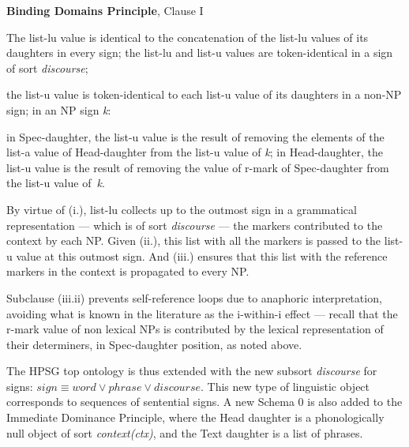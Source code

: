 \documentclass[output=paper
,modfonts
,nonflat]{langsci/langscibook}
\begin{document}
\begin{exe}
\ex\label{bdp}
\textbf{Binding Domains Principle}, Clause I
\begin{xlisti}
\ex The {\sc list-lu} value is identical to the 
concatenation of the {\sc list-lu} values of its daughters in every sign;
\ex  the {\sc list-lu} and {\sc list-u} values are 
token-identical in a sign of sort {\it discourse};
\ex
\begin{xlisti}
\ex  the {\sc list-u} value is token-identical to each 
{\sc list-u} value of its daughters in a non-NP sign;
\ex in an NP sign {\it k}:

\begin{itemize}
\ex in Spec-daughter, the {\sc list-u} value is the result of removing the 
elements of the {\sc list-a} value of Head-daughter from the {\sc list-u} value of {\it k};
\ex in Head-daughter, the {\sc list-u} value is the result of removing 
the value of {\sc r-mark} of Spec-daughter from the {\sc list-u} value of~{\it k}.
\end{itemize}

\end{xlisti}
\end{xlisti}
\end{exe}


\noindent By virtue of (i.), {\sc list-lu} collects up to the outmost sign in a grammatical 
representation --- which is of sort {\it discourse} --- the markers contributed to the context
by each NP. Given (ii.), this list with all the markers is passed to the
{\sc list-u} value at this outmost sign. And (iii.) ensures that this
list with the reference markers in the context is propagated to every NP. 

Subclause (iii.ii) prevents self-reference loops
due to anaphoric interpretation, avoiding what is known 
in the literature as the i-within-i effect --- recall that the {\sc r-mark} value of non lexical NPs 
is contributed by the 
lexical representation of their determiners, in Spec-daughter 
position, as noted above.

The HPSG top ontology is thus extended with the new subsort {\it discourse} 
for signs: $sign \equiv word \vee phrase \vee discourse$. This new type of 
linguistic object corresponds to sequences of sentential signs.
A new Schema 0 is also added to the
Immediate Dominance Principle, where the Head daughter is a 
phonologically null object of sort \emph{context(ctx)}, and the Text daughter 
is a list of phrases. 
\end{document}
